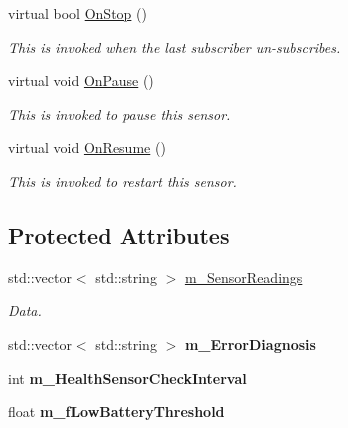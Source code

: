 \begin{DoxyCompactItemize}
virtual bool \hyperlink{class_health_sensor_a65dd981941e06dc9944ab153d7f5b3fd}{On\+Stop} ()
\begin{DoxyCompactList}\small\item\em This is invoked when the last subscriber un-\/subscribes. \end{DoxyCompactList}\item 
\mbox{\label{class_health_sensor_a7724138ea388093eb823b5f738ce41c6}} 
virtual void \hyperlink{class_health_sensor_a7724138ea388093eb823b5f738ce41c6}{On\+Pause} ()
\begin{DoxyCompactList}\small\item\em This is invoked to pause this sensor. \end{DoxyCompactList}\item 
\mbox{\label{class_health_sensor_a9aa8075a5d410b33f754daea6987c14c}} 
virtual void \hyperlink{class_health_sensor_a9aa8075a5d410b33f754daea6987c14c}{On\+Resume} ()
\begin{DoxyCompactList}\small\item\em This is invoked to restart this sensor. \end{DoxyCompactList}\end{DoxyCompactItemize}
\subsection*{Protected Attributes}
\begin{DoxyCompactItemize}
\item 
\mbox{\label{class_health_sensor_a662f2710e3b142bcbd92d59447dd93d6}} 
std\+::vector$<$ std\+::string $>$ \hyperlink{class_health_sensor_a662f2710e3b142bcbd92d59447dd93d6}{m\+\_\+\+Sensor\+Readings}
\begin{DoxyCompactList}\small\item\em Data. \end{DoxyCompactList}\item 
\mbox{\label{class_health_sensor_ab4f25d09f60c558fa22d24c3e47c1ac3}} 
std\+::vector$<$ std\+::string $>$ {\bfseries m\+\_\+\+Error\+Diagnosis}
\item 
\mbox{\label{class_health_sensor_a8eb8cc4610c54c0bd433593cc49c4ebd}} 
int {\bfseries m\+\_\+\+Health\+Sensor\+Check\+Interval}
\item 
\mbox{\label{class_health_sensor_a749550e4090aee3ca92ea997d97f9af8}} 
float {\bfseries m\+\_\+f\+Low\+Battery\+Threshold}
\end{DoxyCompactItemize}
